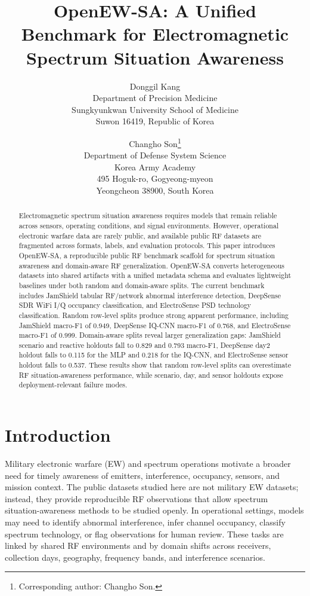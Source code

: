 \documentclass[11pt]{article}
\title{OpenEW-SA: A Unified Benchmark for Electromagnetic Spectrum Situation Awareness}
\author{%
Donggil Kang\\
Department of Precision Medicine\\
Sungkyunkwan University School of Medicine\\
Suwon 16419, Republic of Korea
\and
Changho Son\thanks{Corresponding author: Changho Son.}\\
Department of Defense System Science\\
Korea Army Academy\\
495 Hoguk-ro, Gogyeong-myeon\\
Yeongcheon 38900, South Korea
}
\date{}
\begin{document}
\maketitle

\begin{abstract}
Electromagnetic spectrum situation awareness requires models that remain reliable across sensors, operating conditions, and signal environments. However, operational electronic warfare data are rarely public, and available public RF datasets are fragmented across formats, labels, and evaluation protocols. This paper introduces OpenEW-SA, a reproducible public RF benchmark scaffold for spectrum situation awareness and domain-aware RF generalization. OpenEW-SA converts heterogeneous datasets into shared artifacts with a unified metadata schema and evaluates lightweight baselines under both random and domain-aware splits. The current benchmark includes JamShield tabular RF/network abnormal interference detection, DeepSense SDR WiFi I/Q occupancy classification, and ElectroSense PSD technology classification. Random row-level splits produce strong apparent performance, including JamShield macro-F1 of 0.949, DeepSense IQ-CNN macro-F1 of 0.768, and ElectroSense macro-F1 of 0.999. Domain-aware splits reveal larger generalization gaps: JamShield scenario and reactive holdouts fall to 0.829 and 0.793 macro-F1, DeepSense day2 holdout falls to 0.115 for the MLP and 0.218 for the IQ-CNN, and ElectroSense sensor holdout falls to 0.537. These results show that random row-level splits can overestimate RF situation-awareness performance, while scenario, day, and sensor holdouts expose deployment-relevant failure modes.
\end{abstract}

\section{Introduction}

Military electronic warfare (EW) and spectrum operations motivate a broader need for timely awareness of emitters, interference, occupancy, sensors, and mission context. The public datasets studied here are not military EW datasets; instead, they provide reproducible RF observations that allow spectrum situation-awareness methods to be studied openly. In operational settings, models may need to identify abnormal interference, infer channel occupancy, classify spectrum technology, or flag observations for human review. These tasks are linked by shared RF environments and by domain shifts across receivers, collection days, geography, frequency bands, and interference scenarios.
\end{document}
